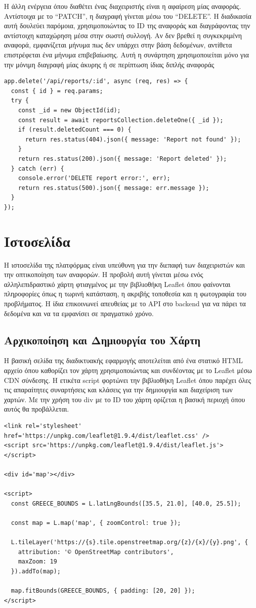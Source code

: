 Η άλλη ενέργεια όπου διαθέτει ένας διαχειριστής είναι η αφαίρεση μίας αναφοράς. Αντίστοιχα με το “PATCH”, η διαγραφή γίνεται μέσω του “DELETE”. Η διαδικασία αυτή δουλεύει παρόμοια, χρησιμοποιώντας το ID της αναφοράς και διαγράφοντας την αντίστοιχη καταχώρηση μέσα στην σωστή συλλογή. Αν δεν βρεθεί η συγκεκριμένη αναφορά, εμφανίζεται μήνυμα πως δεν υπάρχει στην βάση δεδομένων, αντίθετα επιστρέφεται ένα μήνυμα επιβεβαίωσης. Αυτή η συνάρτηση χρησιμοποιείται μόνο για την μόνιμη διαγραφή μίας άκυρης ή σε περίπτωση ίδιας διπλής αναφοράς
\\
\begin{lstlisting}
app.delete('/api/reports/:id', async (req, res) => {
  const { id } = req.params;
  try {
    const _id = new ObjectId(id);
    const result = await reportsCollection.deleteOne({ _id });
    if (result.deletedCount === 0) {
      return res.status(404).json({ message: 'Report not found' });
    }
    return res.status(200).json({ message: 'Report deleted' });
  } catch (err) {
    console.error('DELETE report error:', err);
    return res.status(500).json({ message: err.message });
  }
});
\end{lstlisting}

\section{Ιστοσελίδα}
Η ιστοσελίδα της πλατφόρμας είναι υπεύθυνη για την διεπαφή των διαχειριστών και την οπτικοποίηση των αναφορών. Η προβολή αυτή γίνεται μέσω ενός αλληλεπιδραστικό χάρτη φτιαγμένος με την βιβλιοθήκη Leaflet όπου φαίνονται πληροφορίες όπως η τωρινή κατάσταση, η ακριβής τοποθεσία και η φωτογραφία του προβλήματος. Η ίδια επικοινωνεί απευθείας με το API στο backend για να πάρει τα δεδομένα και να τα εμφανίσει σε πραγματικό χρόνο.

\subsection{Αρχικοποίηση και Δημιουργία του Χάρτη}
Η βασική σελίδα της διαδικτυακής εφαρμογής αποτελείται από ένα στατικό HTML αρχείο όπου καθορίζει τον χάρτη χρησιμοποιώντας και συνδέοντας με το Leaflet μέσω CDN σύνδεσης. Η ετικέτα script φορτώνει την βιβλιοθήκη Leaflet όπου παρέχει όλες τις απαραίτητες συναρτήσεις και κλάσεις για την δημιουργία και διαχείριση των χαρτών. Με την χρήση του div με το ID του χάρτη ορίζεται η βασική περιοχή όπου αυτός θα προβάλλεται.
\begin{lstlisting}
<link rel='stylesheet' href='https://unpkg.com/leaflet@1.9.4/dist/leaflet.css' />
<script src='https://unpkg.com/leaflet@1.9.4/dist/leaflet.js'></script>

<div id='map'></div>

<script>
  const GREECE_BOUNDS = L.latLngBounds([35.5, 21.0], [40.0, 25.5]);

  const map = L.map('map', { zoomControl: true });

  L.tileLayer('https://{s}.tile.openstreetmap.org/{z}/{x}/{y}.png', {
    attribution: '© OpenStreetMap contributors',
    maxZoom: 19
  }).addTo(map);

  map.fitBounds(GREECE_BOUNDS, { padding: [20, 20] });
</script>
\end{lstlisting}

